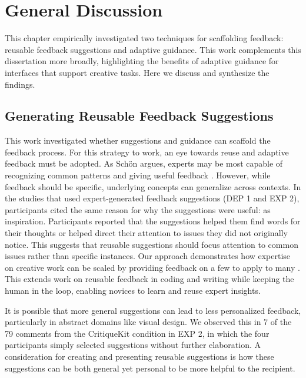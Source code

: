 \section{General Discussion}
This chapter empirically investigated two techniques for scaffolding feedback: reusable feedback suggestions and adaptive guidance. This work complements this dissertation more broadly, highlighting the benefits of adaptive guidance for interfaces that support creative tasks. Here we discuss and synthesize the findings.  

\subsection{Generating Reusable Feedback Suggestions}
This work investigated whether suggestions and guidance can scaffold the feedback process. For this strategy to work, an eye towards reuse and adaptive feedback must be adopted. As Schön argues, experts may be most capable of recognizing common patterns and giving useful feedback \cite{Schon1983}. However, while feedback should be specific, underlying concepts can generalize across contexts. In the studies that used expert-generated feedback suggestions (DEP 1 and EXP 2), participants cited the same reason for why the suggestions were useful: as inspiration. Participants reported that the suggestions helped them find words for their thoughts or helped direct their attention to issues they did not originally notice. This suggests that reusable suggestions should focus attention to common issues rather than specific instances. Our approach demonstrates how expertise on creative work can be scaled by providing feedback on a few to apply to many \cite{Kulkarni2013}. This extends work on reusable feedback in coding and writing \cite{Brooks2014, Hartmann2010, Head2017} while keeping the human in the loop, enabling novices to learn and reuse expert insights. 

It is possible that more general suggestions can lead to less personalized feedback, particularly in abstract domains like visual design. We observed this in 7 of the 79 comments from the CritiqueKit condition in EXP 2, in which the four participants simply selected suggestions without further elaboration. A consideration for creating and presenting reusable suggestions is how these suggestions can be both general yet personal to be more helpful to the recipient. 


